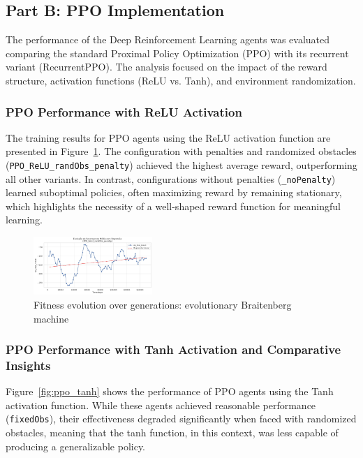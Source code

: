 \documentclass[final,5p,times,twocolumn,authoryear]{elsarticle}
\begin{document}
\subsection{Part B: PPO Implementation}

The performance of the Deep Reinforcement Learning agents was evaluated comparing the standard Proximal Policy Optimization (PPO) with its recurrent variant (RecurrentPPO). The analysis focused on the impact of the reward structure, activation functions (ReLU vs. Tanh), and environment randomization.

\subsubsection{PPO Performance with ReLU Activation}

The training results for PPO agents using the ReLU activation function are presented in Figure~\ref{fig:ppo_relu}. The configuration with penalties and randomized obstacles (\texttt{PPO\_ReLU\_randObs\_penalty}) achieved the highest average reward, outperforming all other variants. In contrast, configurations without penalties (\texttt{\_noPenalty}) learned suboptimal policies, often maximizing reward by remaining stationary, which highlights the necessity of a well-shaped reward function for meaningful learning.

\begin{figure}[H]
    \centering
    \includegraphics[width=0.4\textwidth]{figures/PPO_relu.jpeg}
    \caption{Fitness evolution over generations: evolutionary Braitenberg machine}
    \label{fig:ppo_relu}
\end{figure}
\subsubsection{PPO Performance with Tanh Activation and Comparative Insights}

Figure~\ref{fig:ppo_tanh} shows the performance of PPO agents using the Tanh activation function. While these agents achieved reasonable performance (\texttt{fixedObs}), their effectiveness degraded significantly when faced with randomized obstacles, meaning that the tanh function, in this context, was less capable of producing a generalizable policy.
\end{document}
